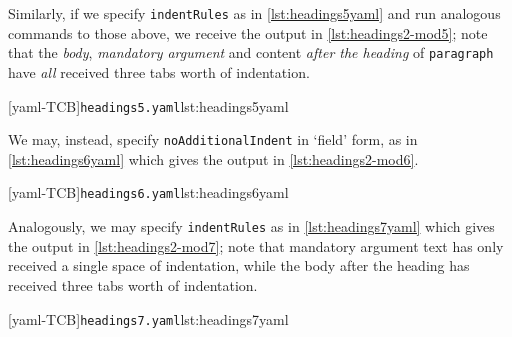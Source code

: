 \documentclass[10pt]{article}
\begin{document}
 \begin{example}
 Similarly, if we specify \texttt{indentRules} as in \cref{lst:headings5yaml} and run
 analogous commands to those above, we receive the output in \cref{lst:headings2-mod5};
 note that the \emph{body}, \emph{mandatory argument} and content \emph{after the
 heading} of \texttt{paragraph} have \emph{all} received three tabs worth of indentation.

 \begin{cmhtcbraster}[raster force size=false,
   raster column 1/.style={add to width=1cm},
   raster column 2/.style={add to width=-1cm},
  ]
  [yaml-TCB]{\texttt{headings5.yaml}}{lst:headings5yaml}
 \end{cmhtcbraster}
 \end{example}

 \begin{example}
 We may, instead, specify \texttt{noAdditionalIndent} in `field' form, as in
 \cref{lst:headings6yaml} which gives the output in \cref{lst:headings2-mod6}.

 \begin{cmhtcbraster}
  [yaml-TCB]{\texttt{headings6.yaml}}{lst:headings6yaml}
 \end{cmhtcbraster}
 \end{example}

 \begin{example}
 Analogously, we may specify \texttt{indentRules} as in \cref{lst:headings7yaml} which
 gives the output in \cref{lst:headings2-mod7}; note that mandatory argument text has
 only received a single space of indentation, while the body after the heading has
 received three tabs worth of indentation.

 \begin{cmhtcbraster}
  [yaml-TCB]{\texttt{headings7.yaml}}{lst:headings7yaml}
 \end{cmhtcbraster}
 \end{example}
\end{document}
